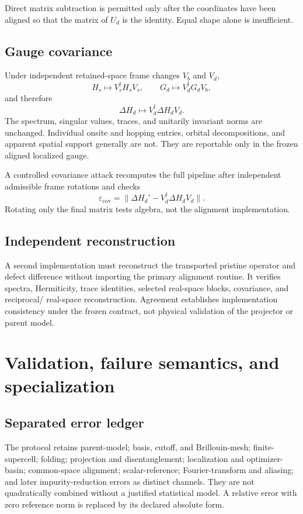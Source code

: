 \documentclass[11pt]{article}
\newenvironment{prospective}{\color{prospectivered}}{}
\begin{document}
\begin{prospective}
Direct matrix subtraction is permitted only after the coordinates have been aligned so
that the matrix of $U_d$ is the identity. Equal shape alone is insufficient.

\subsection{Gauge covariance}
Under independent retained-space frame changes $V_b$ and $V_d$,
\begin{equation}
 H_s\mapsto V_s^\dagger H_sV_s,
 \qquad G_d\mapsto V_d^\dagger G_dV_b,
\end{equation}
and therefore
\begin{equation}
 \Delta H_d\mapsto V_d^\dagger\Delta H_dV_d.
\end{equation}
The spectrum, singular values, traces, and unitarily invariant norms are unchanged.
Individual onsite and hopping entries, orbital decompositions, and apparent spatial
support generally are not. They are reportable only in the frozen aligned localized
gauge.

A controlled covariance attack recomputes the full pipeline after independent admissible
frame rotations and checks
\begin{equation}
 \varepsilon_{\mathrm{cov}}
 =\lVert\Delta H_d'-V_d^\dagger\Delta H_dV_d\rVert.
\end{equation}
Rotating only the final matrix tests algebra, not the alignment implementation.

\subsection{Independent reconstruction}
A second implementation must reconstruct the transported pristine operator and defect
difference without importing the primary alignment routine. It verifies spectra,
Hermiticity, trace identities, selected real-space blocks, covariance, and reciprocal/
real-space reconstruction. Agreement establishes implementation consistency under the
frozen contract, not physical validation of the projector or parent model.

\section{Validation, failure semantics, and specialization}

\subsection{Separated error ledger}
The protocol retains parent-model; basis, cutoff, and Brillouin-mesh; finite-supercell;
folding; projection and disentanglement; localization and optimizer-basin; common-space
alignment; scalar-reference; Fourier-transform and aliasing; and later impurity-reduction
errors as distinct channels. They are not quadratically combined without a justified
statistical model. A relative error with zero reference norm is replaced by its declared
absolute form.


\end{prospective}
\end{document}
